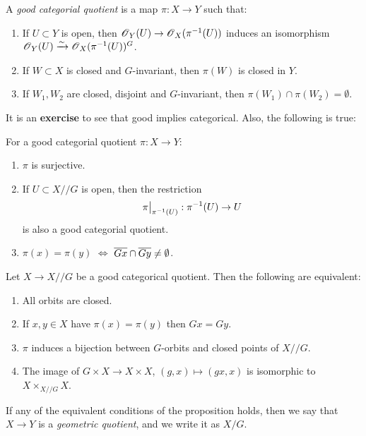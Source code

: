 \documentclass[11pt, english]{article}
\begin{document}
\begin{defi}
A \emph{good categorial quotient} is a map $\pi:X \to Y$ such that:
\begin{enumerate}
\item If $U \subset Y$ is open, then $\operatorname{\mathscr{O}}_Y(U) \to \operatorname{\mathscr{O}}_X(\pi^{-1}(U))$ induces an isomorphism $\operatorname{\mathscr{O}}_Y(U) \xrightarrow{\sim} \operatorname{\mathscr{O}}_X(\pi^{-1}(U))^G$.
\item If $W \subset X$ is closed and $G$-invariant, then $\pi(W)$ is closed in $Y$.
\item If $W_1,W_2$ are closed, disjoint and $G$-invariant, then $\pi(W_1) \cap \pi(W_2) = \emptyset$.
\end{enumerate}
\end{defi}

It is an \textbf{exercise} to see that good implies categorical. Also, the following is true:
\begin{prop}
For a good categorial quotient $\pi:X \to Y$:
\begin{enumerate}
\item $\pi$ is surjective.
\item If $U \subset X /\!/ G$ is open, then the restriction
\[
\restr{\pi}{\pi^{-1}(U)}:\pi^{-1}(U) \to U
\]
is also a good categorial quotient.
\item $\pi(x)=\pi(y)$ $\Leftrightarrow$ $\overline{Gx} \cap \overline{Gy} \neq \emptyset$.
\end{enumerate}
\end{prop}

\begin{prop}
Let $X \to X /\!/ G$ be a good categorical quotient. Then the following are equivalent:
  \begin{enumerate}
  \item All orbits are closed.
\item If $x, y \in X$ have $\pi(x)=\pi(y)$ then $Gx=Gy$.
\item $\pi$ induces a bijection between $G$-orbits and closed points of $X /\!/ G$.
\item The image of $G \times X \to X \times X$, $(g,x) \mapsto (gx,x)$ is isomorphic to $X \times_{X /\!/ G} X$.
  \end{enumerate}
\end{prop}

\begin{defi}
  If any of the equivalent conditions of the proposition holds, then we say that $X \to Y$ is a \emph{geometric quotient}, and we write it as $X/G$.
\end{defi}
\end{document}
